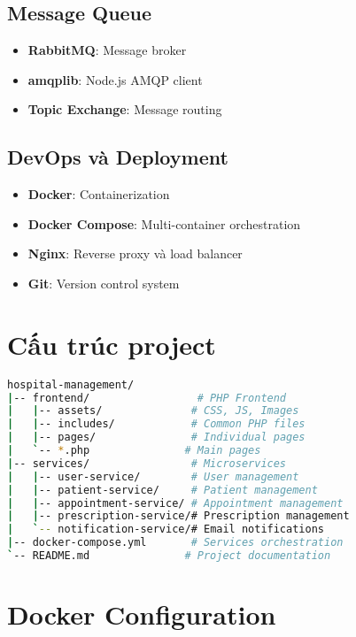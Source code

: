 \documentclass[12pt,a4paper]{report}
\begin{document}
\subsection{Message Queue}
\begin{itemize}
    \item \textbf{RabbitMQ}: Message broker
    \item \textbf{amqplib}: Node.js AMQP client
    \item \textbf{Topic Exchange}: Message routing
\end{itemize}

\subsection{DevOps và Deployment}
\begin{itemize}
    \item \textbf{Docker}: Containerization
    \item \textbf{Docker Compose}: Multi-container orchestration
    \item \textbf{Nginx}: Reverse proxy và load balancer
    \item \textbf{Git}: Version control system
\end{itemize}

\section{Cấu trúc project}

\begin{lstlisting}[language=bash]
hospital-management/
|-- frontend/                 # PHP Frontend
|   |-- assets/              # CSS, JS, Images
|   |-- includes/            # Common PHP files
|   |-- pages/               # Individual pages
|   `-- *.php               # Main pages
|-- services/                # Microservices
|   |-- user-service/        # User management
|   |-- patient-service/     # Patient management
|   |-- appointment-service/ # Appointment management
|   |-- prescription-service/# Prescription management
|   `-- notification-service/# Email notifications
|-- docker-compose.yml       # Services orchestration
`-- README.md               # Project documentation
\end{lstlisting}

\section{Docker Configuration}
\end{document}
